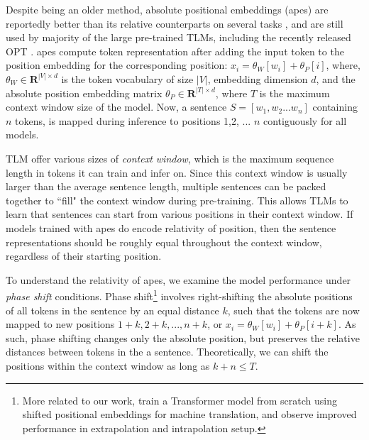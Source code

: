 \documentclass[letterpaper, 12pt]{report}
\begin{document}


Despite being an older method, absolute positional embeddings (\acrshort{ape}s) are reportedly better than its relative counterparts on several tasks \citep{ravishankar-etal-2021-multilingual}, and are still used by majority of the large pre-trained TLMs, including the recently released OPT \cite{Zhang2022:OPT}.
\acrshort{ape}s compute token representation after adding the input token to the position embedding for the corresponding position: $x_i = \theta_{W}[w_i] + \theta_{P}[i]$,
where, $\theta_W \in \mathbf{R}^{|V| \times d}$ is the token vocabulary of size $|V|$, embedding dimension $d$, and the absolute position embedding matrix $\theta_P \in \mathbf{R}^{|T|\times d}$, where $T$ is the maximum context window size of the model.
Now, a sentence $S=[w_1,w_2 ... w_n]$ containing $n$ tokens, is mapped during inference to positions 1,2, ... $n$ contiguously for all models.

TLM offer various sizes of \textit{context window}, which is the maximum sequence length in tokens it can train and infer on.
Since this context window is usually larger than the average sentence length, multiple sentences can be packed together to ``fill" the context window during pre-training.
This allows TLMs to learn that sentences can start from various positions in their context window. If models trained with \acrshort{ape}s do encode relativity of position, then the sentence representations should be roughly equal throughout the context window, regardless of their starting position.

To understand the relativity of \acrshort{ape}s, we examine the model performance under \textit{phase shift} conditions.
Phase shift\footnote{More related to our work, \citet{kiyono2021} train a Transformer model from scratch using shifted positional embeddings for machine translation, and observe improved performance in extrapolation and intrapolation setup.} involves right-shifting the absolute positions of all tokens in the sentence by an equal distance $k$, such that the tokens are now mapped to new positions $1+k, 2+k, ... , n+k$, or $x_i = \theta_{W}[w_i] + \theta_{P}[i+k]$.
As such, phase shifting changes only the absolute position, but preserves the relative distances between tokens in the a sentence.
Theoretically, we can shift the positions within the context window as long as $k+n \leq T$. %
\end{document}
